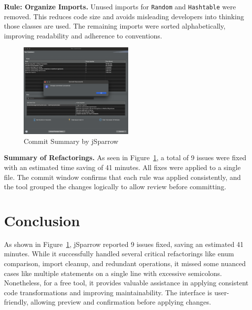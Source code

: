 \documentclass[a4paper,12pt]{article}
\begin{document}
\textbf{Rule: Organize Imports.} Unused imports for \texttt{Random} and \texttt{Hashtable} were removed. This reduces code size and avoids misleading developers into thinking those classes are used. The remaining imports were sorted alphabetically, improving readability and adherence to conventions.

\begin{figure}[H]
  \centering
  \includegraphics[width=0.5\textwidth]{commit-changes.png}
  \caption{Commit Summary by jSparrow}
  \label{fig:commit-changes}
\end{figure}

\textbf{Summary of Refactorings.} As seen in Figure~\ref{fig:commit-changes}, a total of 9 issues were fixed with an estimated time saving of 41 minutes. All fixes were applied to a single file. The commit window confirms that each rule was applied consistently, and the tool grouped the changes logically to allow review before committing.

\section{Conclusion}

As shown in Figure~\ref{fig:commit-changes}, jSparrow reported 9 issues fixed, saving an estimated 41 minutes. While it successfully handled several critical refactorings like enum comparison, import cleanup, and redundant operations, it missed some nuanced cases like multiple statements on a single line with excessive semicolons. Nonetheless, for a free tool, it provides valuable assistance in applying consistent code transformations and improving maintainability. The interface is user-friendly, allowing preview and confirmation before applying changes.
\end{document}
